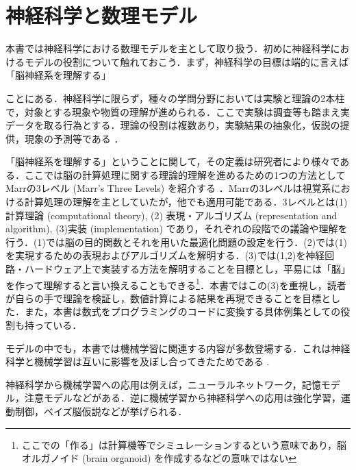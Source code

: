\section{神経科学と数理モデル
}
本書では神経科学における数理モデルを主として取り扱う．初めに神経科学におけるモデルの役割について触れておこう．まず，神経科学の目標は端的に言えば「脳神経系を理解する」

ことにある．神経科学に限らず，種々の学問分野においては実験と理論の2本柱で，対象とする現象や物質の理解が進められる．ここで実験は調査等も踏まえ実データを取る行為とする．理論の役割は複数あり，実験結果の抽象化，仮説の提供，現象の予測等である \citep{Blohm2020-vc}．



「脳神経系を理解する」ということに関して，その定義は研究者により様々である．ここでは脳の計算処理に関する理論的理解を進めるための1つの方法として Marrの3レベル (Marr's Three Levels) を紹介する \citep{Marr1982-wk}．Marrの3レベルは視覚系における計算処理の理解を主としていたが，他でも適用可能である．3レベルとは(1)計算理論 (computational theory), (2) 表現・アルゴリズム (representation and algorithm), (3)実装 (implementation) であり，それぞれの段階での議論や理解を行う．(1)では脳の目的関数とそれを用いた最適化問題の設定を行う．(2)では(1)を実現するための表現およびアルゴリズムを解明する．(3)では(1,2)を神経回路・ハードウェア上で実装する方法を解明することを目標とし，平易には「脳」を作って理解すると言い換えることもできる\footnote{ここでの「作る」は計算機等でシミュレーションするという意味であり，脳オルガノイド (brain organoid) を作成するなどの意味ではない}．本書ではこの(3)を重視し，読者が自らの手で理論を検証し，数値計算による結果を再現できることを目標とした．また，本書は数式をプログラミングのコードに変換する具体例集としての役割も持っている．



モデルの中でも，本書では機械学習に関連する内容が多数登場する．これは神経科学と機械学習は互いに影響を及ぼし合ってきたためである \citep{Hassabis2017-zm}. 

神経科学から機械学習への応用は例えば，ニューラルネットワーク，記憶モデル，注意モデルなどがある．逆に機械学習から神経科学への応用は強化学習，運動制御，ベイズ脳仮説などが挙げられる．
